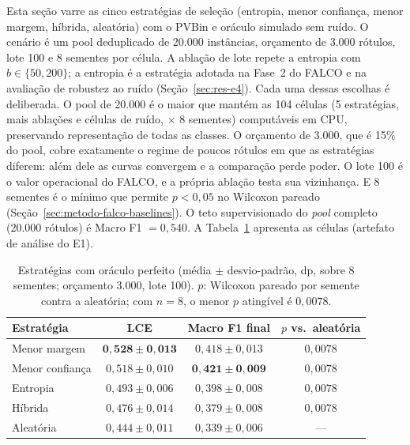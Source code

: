 Esta seção varre as cinco estratégias de seleção (entropia, menor confiança,
menor margem, híbrida, aleatória) com o PVBin e oráculo simulado sem ruído. O
cenário é um pool deduplicado de 20.000 instâncias, orçamento de 3.000 rótulos,
lote 100 e 8 sementes por célula. A ablação de lote repete a entropia com
$b \in \{50, 200\}$; a entropia é a estratégia adotada na Fase~2 do FALCO e na
avaliação de robustez ao ruído (Seção~\ref{sec:res-e4}). Cada uma dessas escolhas é deliberada. O pool de 20.000 é o maior que mantém as
104 células (5 estratégias, mais ablações e células de ruído, $\times$ 8
sementes) computáveis em CPU, preservando representação de todas as classes. O
orçamento de 3.000, que é 15\% do pool, cobre exatamente o regime de poucos
rótulos em que as estratégias diferem: além dele as curvas convergem e a
comparação perde poder. O lote 100 é o valor operacional do FALCO, e a própria
ablação testa sua vizinhança. E 8 sementes é o mínimo que permite $p<0{,}05$ no
Wilcoxon pareado (Seção~\ref{sec:metodo-falco-baselines}).
O teto supervisionado do \textit{pool} completo (20.000 rótulos) é Macro F1
$= 0{,}540$. A Tabela~\ref{tab:e1} apresenta as células
(artefato de análise do E1).

\begin{table}[htb]
\centering
\caption{Estratégias com oráculo perfeito (média $\pm$ desvio-padrão, dp, sobre 8
sementes; orçamento 3.000, lote 100). $p$: Wilcoxon pareado por semente
contra a aleatória; com $n=8$, o menor $p$ atingível é $0{,}0078$.}
\label{tab:e1}
\begin{tabular}{lccc}
\toprule
Estratégia & LCE & Macro F1 final & $p$ vs.\ aleatória \\
\midrule
Menor margem     & $\mathbf{0{,}528 \pm 0{,}013}$ & $0{,}418 \pm 0{,}013$ & $0{,}0078$ \\
Menor confiança  & $0{,}518 \pm 0{,}010$ & $\mathbf{0{,}421 \pm 0{,}009}$ & $0{,}0078$ \\
Entropia         & $0{,}493 \pm 0{,}006$ & $0{,}398 \pm 0{,}008$ & $0{,}0078$ \\
Híbrida          & $0{,}476 \pm 0{,}014$ & $0{,}379 \pm 0{,}008$ & $0{,}0078$ \\
Aleatória        & $0{,}444 \pm 0{,}011$ & $0{,}339 \pm 0{,}006$ & --- \\
\bottomrule
\end{tabular}
\end{table}

